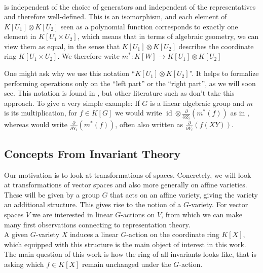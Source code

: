 \begin{definition}
\begin{equation}
\begin{aligned}
    \end{aligned}
  \end{equation}
  is independent of the choice of generators and independent of the representatives and therefore well-defined.
  This is an isomorphism, and each element of $K[U_1]\otimes K[U_2]$ seen as a polynomial function corresponds to exactly one element in $K[U_1 \times U_2]$, which means that in terms of algebraic geometry, we can view them as equal, in the sense that $K[U_1]\otimes K[U_2]$ describes the coordinate ring $K[U_1 \times U_2]$.
  We therefore write $m^\ast \colon K[W]\rightarrow K[U_1]\otimes K[U_2]$
\end{definition}

\begin{remark}
One might ask why we use this notation ``$K[U_1]\otimes K[U_2]$''.
It helps to formalize performing operations only on the ``left part'' or the ``right part'', as we will soon see.
This notation is found in \cite{DK15}, but other literature such as \cite{Stu08} don't take this approach.
To give a very simple example:
If $G$ is a linear algebraic group and $m$ is its multiplication, for $f \in  K[G] $ we would write $\operatorname{id} \otimes \frac{\partial}{\partial Z_i} (m^\ast (f))$ as in \cite{DK15}, whereas \cite{Stu08} would write $\frac{\partial}{\partial Y_i} (m^\ast (f))$, often also written as $\frac{\partial}{\partial Y_i} (f(XY))$.
\end{remark}

\subsection{Concepts From Invariant Theory}

Our motivation is to look at transformations of spaces.
Concretely, we will look at transformations of vector spaces and also more generally on affine varieties.
These will be given by a group $G$ that acts on an affine variety, giving the variety an additional structure.
This gives rise to the notion of a $G$-variety.
For vector spaces $V$ we are interested in linear $G$-actions on $V$, from which we can make many first observations connecting to representation theory.  \\
A given $G$-variety $X$ induces a linear $G$-action on the coordinate ring $K[X]$, which equipped with this structure is the main object of interest in this work.
The main question of this work is how the ring of all invariants looks like, that is asking which $f \in K[X]$ remain unchanged under the $G$-action.

